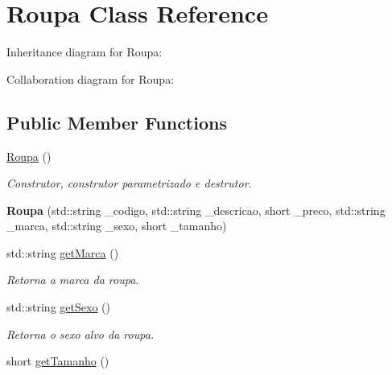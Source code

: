 \hypertarget{classRoupa}{}\section{Roupa Class Reference}
\label{classRoupa}


Inheritance diagram for Roupa\+:


Collaboration diagram for Roupa\+:
\subsection*{Public Member Functions}
\begin{DoxyCompactItemize}
\item 
\hyperlink{classRoupa_a0b8186c1c35089bebd88c8a3d0acf74b}{Roupa} ()\hypertarget{classRoupa_a0b8186c1c35089bebd88c8a3d0acf74b}{}\label{classRoupa_a0b8186c1c35089bebd88c8a3d0acf74b}

\begin{DoxyCompactList}\small\item\em Construtor, construtor parametrizado e destrutor. \end{DoxyCompactList}\item 
{\bfseries Roupa} (std\+::string \+\_\+codigo, std\+::string \+\_\+descricao, short \+\_\+preco, std\+::string \+\_\+marca, std\+::string \+\_\+sexo, short \+\_\+tamanho)\hypertarget{classRoupa_a010b272cfa4ebd9200102a4747f0b89f}{}\label{classRoupa_a010b272cfa4ebd9200102a4747f0b89f}

\item 
std\+::string \hyperlink{classRoupa_a627cb05c4d7401b97bae9902b6fcbff8}{get\+Marca} ()\hypertarget{classRoupa_a627cb05c4d7401b97bae9902b6fcbff8}{}\label{classRoupa_a627cb05c4d7401b97bae9902b6fcbff8}

\begin{DoxyCompactList}\small\item\em Retorna a marca da roupa. \end{DoxyCompactList}\item 
std\+::string \hyperlink{classRoupa_ac9fe45d8a8b73d28c15653ab8e8acdbb}{get\+Sexo} ()\hypertarget{classRoupa_ac9fe45d8a8b73d28c15653ab8e8acdbb}{}\label{classRoupa_ac9fe45d8a8b73d28c15653ab8e8acdbb}

\begin{DoxyCompactList}\small\item\em Retorna o sexo alvo da roupa. \end{DoxyCompactList}\item 
short \hyperlink{classRoupa_ac648ebfcf365456617011aa1cbeb9a5c}{get\+Tamanho} ()\hypertarget{classRoupa_ac648ebfcf365456617011aa1cbeb9a5c}{}\label{classRoupa_ac648ebfcf365456617011aa1cbeb9a5c}


\end{DoxyCompactItemize}
